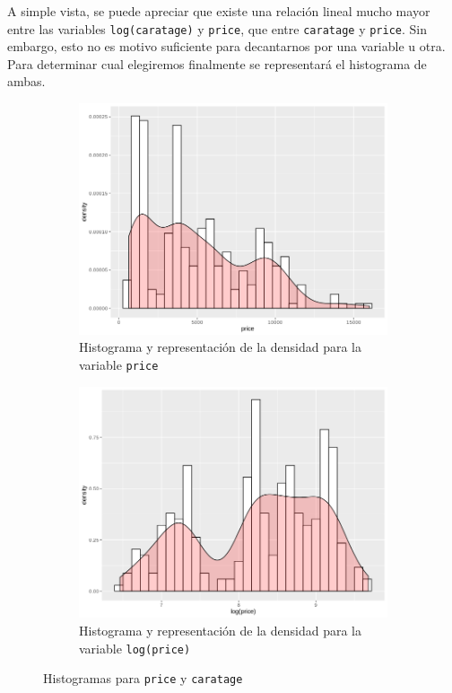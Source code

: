 \documentclass[a4paper, 7pt]{article}
\begin{document}
A simple vista, se puede apreciar que existe una relación lineal mucho mayor entre las variables \texttt{log(caratage)} y \texttt{price}, que entre \texttt{caratage} y \texttt{price}. Sin embargo, esto no es motivo suficiente para decantarnos por una variable u otra. Para determinar cual elegiremos finalmente se representará el histograma de ambas.

\begin{figure}[h!]
  \centering
  \begin{subfigure}[b]{0.25\linewidth}
    \includegraphics[width=\linewidth]{report/images/question-1/histogram-price.png}
    \caption{Histograma y representación de la densidad para la variable \texttt{price}}
  \end{subfigure}
  \begin{subfigure}[b]{0.25\linewidth}
    \includegraphics[width=\linewidth]{report/images/question-1/histogram-logprice.png}
    \caption{Histograma y representación de la densidad para la variable \texttt{log(price)}}
  \end{subfigure}
  \caption{Histogramas para \texttt{price} y \texttt{caratage}}
  \label{fig:coffee}
\end{figure}
\end{document}
